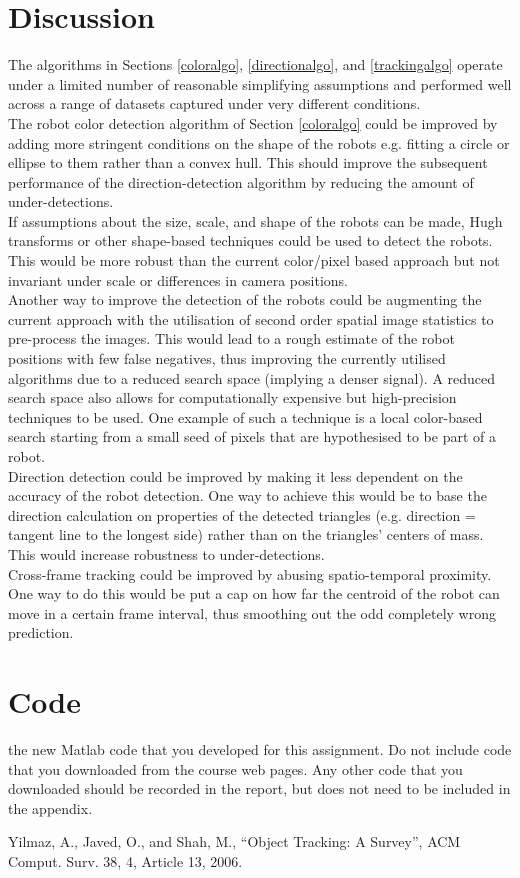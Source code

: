 \documentclass[10pt,a4paper]{article}
\begin{document}
\section{Discussion}\label{discussion}
The algorithms in Sections \ref{coloralgo}, \ref{directionalgo}, and 
\ref{trackingalgo} operate under a limited number of reasonable simplifying
assumptions and performed well across a range of datasets captured under very
different conditions.\\
The robot color detection algorithm of Section \ref{coloralgo} could be improved
by adding more stringent conditions on the shape of the robots e.g. fitting a
circle or ellipse to them rather than a convex hull. This should improve the
subsequent performance of the direction-detection algorithm by reducing the
amount of under-detections.\\
If assumptions about the size, scale, and shape of the robots can be made, Hugh 
transforms or other shape-based techniques could be used to detect the robots.
This would be more robust than the current color/pixel based approach but not 
invariant under scale or differences in camera positions.\\
Another way to improve the detection of the robots could be augmenting the
current approach with the utilisation of second order spatial image statistics
to pre-process the images. This would lead to a rough estimate of the robot
positions with few false negatives, thus improving the currently utilised
algorithms due to a reduced search space (implying a denser signal). A reduced
search space also allows for computationally expensive but high-precision 
techniques to be used. One example of such a technique is a local color-based
search starting from a small seed of pixels that are hypothesised to be part of
a robot.\\
Direction detection could be improved by making it less dependent on the
accuracy of the robot detection. One way to achieve this would be to base the 
direction calculation on properties of the detected triangles (e.g. direction =
tangent line to the longest side) rather than on the triangles' centers of 
mass. This would increase robustness to under-detections.\\
Cross-frame tracking could be improved by abusing spatio-temporal proximity. One
way to do this would be put a cap on how far the centroid of the robot can move 
in a certain frame interval, thus smoothing out the odd completely wrong 
prediction.


\section{Code}\label{code}
the new Matlab code that you developed for this assignment. Do not
include code that you downloaded from the course web pages. Any other code
that you downloaded should be recorded in the report, but does not need to
be included in the appendix.


\begin{thebibliography}{10}
 Yilmaz, A., Javed, O., and Shah, M., 
``Object Tracking: A Survey'', 
ACM Comput. Surv. 38, 4, Article 13, 2006.  
\end{thebibliography}
\end{document}
